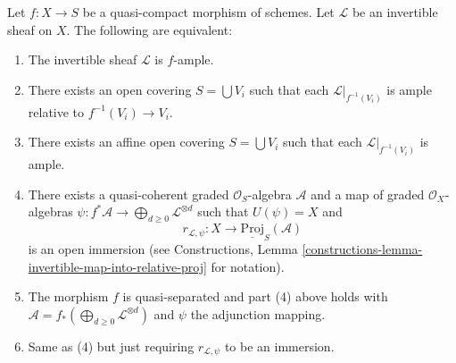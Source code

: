 \begin{lemma}
\label{lemma-characterize-relatively-ample}
Let $f : X \to S$ be a quasi-compact morphism of schemes.
Let $\mathcal{L}$ be an invertible sheaf on $X$.
The following are equivalent:
\begin{enumerate}
\item The invertible sheaf $\mathcal{L}$ is $f$-ample.
\item There exists an open covering $S = \bigcup V_i$
such that each $\mathcal{L}|_{f^{-1}(V_i)}$ is ample
relative to $f^{-1}(V_i) \to V_i$.
\item There exists an affine open covering $S = \bigcup V_i$
such that each $\mathcal{L}|_{f^{-1}(V_i)}$ is ample.
\item There exists a quasi-coherent graded $\mathcal{O}_S$-algebra
$\mathcal{A}$ and a map of graded $\mathcal{O}_X$-algebras
$\psi : f^*\mathcal{A} \to \bigoplus_{d \geq 0} \mathcal{L}^{\otimes d}$
such that $U(\psi) = X$ and
$$
r_{\mathcal{L}, \psi} :
X
\longrightarrow
\underline{\text{Proj}}_S(\mathcal{A})
$$
is an open immersion (see Constructions, Lemma
\ref{constructions-lemma-invertible-map-into-relative-proj} for notation).
\item The morphism $f$ is quasi-separated and
part (4) above holds with
$\mathcal{A} = f_*(\bigoplus_{d \geq 0} \mathcal{L}^{\otimes d})$
and $\psi$ the adjunction mapping.
\item Same as (4) but just requiring $r_{\mathcal{L}, \psi}$
to be an immersion.
\end{enumerate}
\end{lemma}

